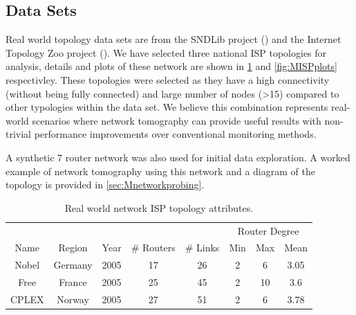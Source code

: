 \subsection{Data Sets}
\label{ssec:Mdatasets}
Real world topology data sets are from the SNDLib project (\cite{orlowski_sndlib_2007}) and the Internet Topology Zoo project (\cite{knight_internet_2011}). We have selected three national ISP topologies for analysis, details and plots of these network are shown in \cref{tbl:Mrealnetworkattributes} and \cref{fig:MISPplots} respectivley. These topologies were selected as they have a high connectivity (without being fully connected) and large number of nodes (>15) compared to other typologies within the data set. We believe this combination represents real-world scenarios where network tomography can provide useful results with non-trivial performance improvements over conventional monitoring methods.\par
A synthetic 7 router network was also used for initial data exploration. A worked example of network tomography using this network and a diagram of the topology is provided in \cref{sec:Mnetworkprobing}.\par
  \begin{table}
    \centering
    \begin{tabular}{@{}cccccccc@{}} 
      \toprule
      &&&&&\multicolumn{3}{c}{Router Degree}\\
      \cmidrule{6-8}
      Name & Region & Year & \# Routers & \# Links & Min & Max & Mean \\
      \midrule
      Nobel & Germany & 2005 & 17 & 26 & 2 & 6 & 3.05\\
      Free & France & 2005 & 25 & 45 & 2 & 10 & 3.6\\
      CPLEX & Norway & 2005 & 27 & 51 & 2 & 6 & 3.78\\
      \bottomrule
    \end{tabular}
    \caption{Real world network ISP topology attributes.}
    \label{tbl:Mrealnetworkattributes}
  \end{table}

